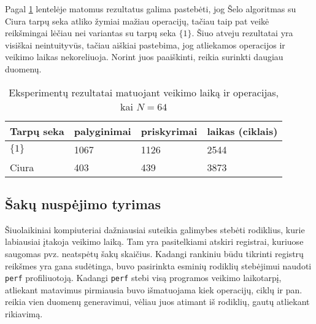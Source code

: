 \documentclass{VUMIFInfBakalaurinis}
\begin{document}
Pagal \ref{experiment_results_64} lentelėje matomus rezultatus galima pastebėti, jog
Šelo algoritmas su Ciura tarpų seka atliko žymiai mažiau operacijų, tačiau taip pat veikė reikšmingai lėčiau nei variantas su tarpų seka  $\{1\}$.
Šiuo atveju rezultatai yra visiškai neintuityvūs, tačiau aiškiai pastebima, jog atliekamos operacijos ir veikimo laikas nekoreliuoja.
Norint juos paaiškinti, reikia surinkti daugiau duomenų. 

\begin{table}[H]
  \caption{Eksperimentų rezultatai matuojant veikimo laiką ir operacijas, kai $N = 64$}
  \label{experiment_results_64}
  \centering
  \begin{tabular}{@{}llll@{}}
  Tarpų seka            & palyginimai       & priskyrimai      & laikas (ciklais) \\ \midrule
  $\{1\}$               & 1067              & 1126             & 2544                  \\
  Ciura                 & 403               & 439              & 3873                  \\ \bottomrule
  \end{tabular}
\end{table}

\subsection{Šakų nuspėjimo tyrimas}

Šiuolaikiniai kompiuteriai dažniausiai suteikia galimybes stebėti rodiklius, kurie labiausiai įtakoja veikimo laiką.
Tam yra pasitelkiami atskiri registrai, kuriuose saugomas pvz. neatspėtų šakų skaičius.
Kadangi rankiniu būdu tikrinti registrų reikšmes yra gana sudėtinga, buvo pasirinkta esminių rodiklių stebėjimui naudoti \verb|perf| profiliuotoją.
Kadangi \verb|perf| stebi visą programos veikimo laikotarpį, atliekant matavimus pirmiausia buvo išmatuojama kiek operacijų, ciklų ir pan. reikia vien duomenų generavimui,
vėliau juos atimant iš rodiklių, gautų atliekant rikiavimą.
\end{document}
